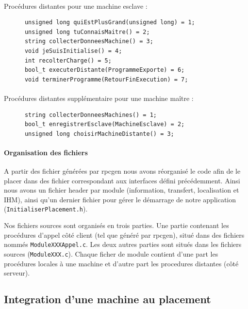     
    \paragraph{}
    \noindent Procédures distantes pour une machine esclave :
    
    \begin{verbatim}
      unsigned long quiEstPlusGrand(unsigned long) = 1;
      unsigned long tuConnaisMaitre() = 2;
      string collecterDonneesMachine() = 3;
      void jeSuisInitialise() = 4;
      int recolterCharge() = 5;
      bool_t executerDistante(ProgrammeExporte) = 6;
      void terminerProgramme(RetourFinExecution) = 7;
    \end{verbatim}
    
    \paragraph{}
    \noindent Procédures distantes supplémentaire pour une machine maître :
    \begin{verbatim}
      string collecterDonneesMachines() = 1;
      bool_t enregistrerEsclave(MachineEsclave) = 2;
      unsigned long choisirMachineDistante() = 3;
    \end{verbatim}
    
    \paragraph{Organisation des fichiers}
    A partir des fichier générées par rpcgen nous avons réorganisé le code
    afin de le placer dans des fichier correspondant aux interfaces défini
    précédemment. Ainsi nous avons un fichier header par module (information,
    transfert, localisation et IHM), ainsi qu'un dernier fichier pour 
    gérer le démarrage de notre application (\verb"InitialiserPlacement.h").
    
    Nos fichiers sources sont organisés en trois parties. Une partie 
    contenant les procédures d'appel côté client (tel que généré par
    rpcgen), situé dans des fichiers nommés \verb"ModuleXXXAppel.c". Les deux
    autres parties sont situés dans les fichiers sources (\verb"ModuleXXX.c").
    Chaque ficher de module contient d'une part les procédures locales à
    une machine et d'autre part les procedures distantes (côté serveur).
    
  
    
  \subsection{Integration d'une machine au placement}
